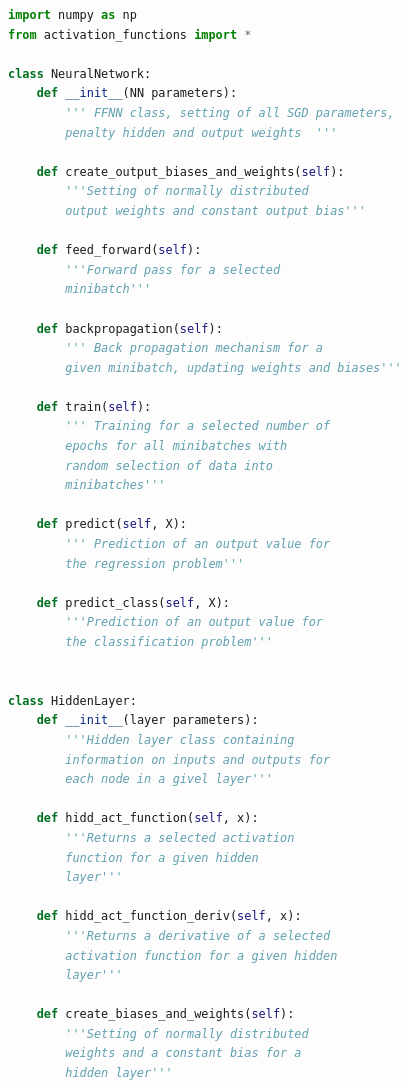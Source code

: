 \documentclass{emulateapj}
\begin{document}
\begin{lstlisting}[language=Python, caption={Structure of the NeuralNetwork and HiddenLayer classes}]
import numpy as np
from activation_functions import *

class NeuralNetwork:
    def __init__(NN parameters):
        ''' FFNN class, setting of all SGD parameters, 
        penalty hidden and output weights  '''
        
    def create_output_biases_and_weights(self):
        '''Setting of normally distributed 
        output weights and constant output bias'''
        
    def feed_forward(self):
        '''Forward pass for a selected 
        minibatch'''
        
    def backpropagation(self):
        ''' Back propagation mechanism for a 
        given minibatch, updating weights and biases'''
        
    def train(self):
        ''' Training for a selected number of 
        epochs for all minibatches with 
        random selection of data into 
        minibatches'''
        
    def predict(self, X):
        ''' Prediction of an output value for 
        the regression problem'''
        
    def predict_class(self, X):
        '''Prediction of an output value for 
        the classification problem'''


class HiddenLayer:
    def __init__(layer parameters):
        '''Hidden layer class containing 
        information on inputs and outputs for 
        each node in a givel layer'''
        
    def hidd_act_function(self, x):
        '''Returns a selected activation 
        function for a given hidden 
        layer'''
        
    def hidd_act_function_deriv(self, x):
        '''Returns a derivative of a selected 
        activation function for a given hidden 
        layer'''
        
    def create_biases_and_weights(self):
        '''Setting of normally distributed 
        weights and a constant bias for a 
        hidden layer'''
\end{lstlisting}
\end{document}
